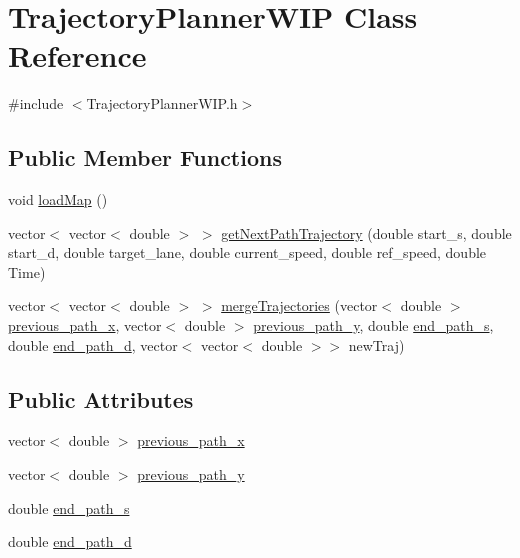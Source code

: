 \hypertarget{classTrajectoryPlannerWIP}{}\section{Trajectory\+Planner\+W\+IP Class Reference}
\label{classTrajectoryPlannerWIP}


{\ttfamily \#include $<$Trajectory\+Planner\+W\+I\+P.\+h$>$}

\subsection*{Public Member Functions}
\begin{DoxyCompactItemize}
\item 
void \hyperlink{classTrajectoryPlannerWIP_ae13818910d1d7b7a65eacf49ebd1682d}{load\+Map} ()
\item 
vector$<$ vector$<$ double $>$ $>$ \hyperlink{classTrajectoryPlannerWIP_a9c53694540c32d1e724def363c20d310}{get\+Next\+Path\+Trajectory} (double start\+\_\+s, double start\+\_\+d, double target\+\_\+lane, double current\+\_\+speed, double ref\+\_\+speed, double Time)
\item 
vector$<$ vector$<$ double $>$ $>$ \hyperlink{classTrajectoryPlannerWIP_aeb7dc782540b1e43b7be2f7075d23b75}{merge\+Trajectories} (vector$<$ double $>$ \hyperlink{classTrajectoryPlannerWIP_a74997cfa081e6d4409d4d2234e5b3855}{previous\+\_\+path\+\_\+x}, vector$<$ double $>$ \hyperlink{classTrajectoryPlannerWIP_a32a8ed201b7abf6a5817e17ba5e4fca3}{previous\+\_\+path\+\_\+y}, double \hyperlink{classTrajectoryPlannerWIP_a1239028b8c1d13c6e03237f160965112}{end\+\_\+path\+\_\+s}, double \hyperlink{classTrajectoryPlannerWIP_a45a0c4e41dae17e9387b358d472bdb55}{end\+\_\+path\+\_\+d}, vector$<$ vector$<$ double $>$$>$ new\+Traj)
\end{DoxyCompactItemize}
\subsection*{Public Attributes}
\begin{DoxyCompactItemize}
\item 
vector$<$ double $>$ \hyperlink{classTrajectoryPlannerWIP_a74997cfa081e6d4409d4d2234e5b3855}{previous\+\_\+path\+\_\+x}
\item 
vector$<$ double $>$ \hyperlink{classTrajectoryPlannerWIP_a32a8ed201b7abf6a5817e17ba5e4fca3}{previous\+\_\+path\+\_\+y}
\item 
double \hyperlink{classTrajectoryPlannerWIP_a1239028b8c1d13c6e03237f160965112}{end\+\_\+path\+\_\+s}
\item 
double \hyperlink{classTrajectoryPlannerWIP_a45a0c4e41dae17e9387b358d472bdb55}{end\+\_\+path\+\_\+d}
\end{DoxyCompactItemize}
